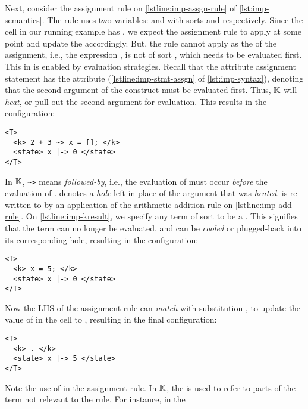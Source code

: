 Next, consider the assignment rule on \autoref{lstline:imp-assgn-rule} of
\autoref{lst:imp-semantics}. The rule uses two variables:  and 
with sorts  and  respectively. Since the 
cell in our running example has , we expect the assignment
rule to apply at some point and update the  accordingly.
But, the rule cannot apply as the \RHS{} of the assignment, i.e., the expression
, is not of sort , which needs to be evaluated
first. This in \K{} is enabled by evaluation strategies.
Recall that the attribute assignment statement has the attribute
 (\autoref{lstline:imp-stmt-assgn} of
\autoref{lst:imp-syntax}), denoting that the second argument of the
construct must be evaluated first. Thus,
$\mathbb{K}$ will \emph{heat}, or pull-out the second
argument for evaluation. This results in the configuration:
\begin{lstlisting}[language=k,style=ksty]
<T>
  <k> 2 + 3 ~> x = []; </k>
  <state> x |-> 0 </state>
</T>
\end{lstlisting}
In $\mathbb{K}{}$, \lstinline[style=inlineksty]{~>} means \emph{followed-by}, i.e.,
the evaluation of  must occur \emph{before} the evaluation
of . \inlinek{[]} denotes a \emph{hole} left in place of
the argument that was \emph{heated}.
is re-written to 
by an application of the arithmetic addition rule on
\autoref{lstline:imp-add-rule}. On
\autoref{lstline:imp-kresult},
we specify any term of sort  to be a .
This signifies that the term can no longer be evaluated, and can be \emph{cooled}
or plugged-back into its corresponding hole, resulting in the configuration:
\begin{lstlisting}[language=k,style=ksty]
<T>
  <k> x = 5; </k>
  <state> x |-> 0 </state>
</T>
\end{lstlisting}
Now the LHS of the assignment rule can \emph{match} with substitution
, to
update the value of  in the  cell
to , resulting in the final configuration:
\begin{lstlisting}[language=k,style=ksty]
<T>
  <k> . </k>
  <state> x |-> 5 </state>
</T>
\end{lstlisting}
Note the use of  in the assignment rule. In $\mathbb{K}{}$,
the  is used to refer to parts of the term
not relevant to the rule. For instance, in the 
